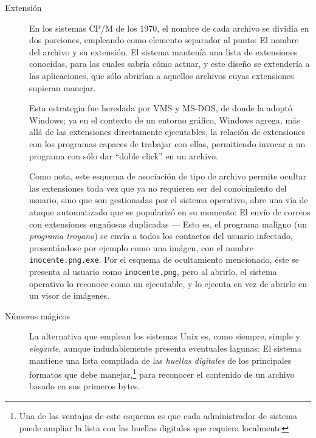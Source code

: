 \documentclass[11pt,fleqn]{book} %
\begin{document}
\begin{description}
\item[Extensión] En los sistemas CP/M de los 1970, el nombre de cada
               archivo se dividía en dos porciones, empleando como
               elemento separador al punto: El nombre del archivo y su
               extensión. El sistema mantenía una lista de extensiones
               conocidas, para las cuales sabría cómo actuar, y este
               diseño se extendería a las aplicaciones, que sólo
               abrirían a aquellos archivos cuyas extensiones
               supieran manejar.

	       Esta estrategia fue heredada por VMS y MS-DOS, de
               donde la adoptó Windows; ya en el contexto de un
               entorno gráfico, Windows agrega, más allá de las
               extensiones directamente ejecutables, la relación de
               extensiones con los programas capaces de trabajar con
               ellas, permitiendo invocar a un programa con sólo dar
               ``doble click'' en un archivo.

	       Como nota, este esquema de asociación de tipo de
               archivo permite ocultar las extensiones toda vez que ya
               no requieren ser del conocimiento del usuario, sino que
               son gestionadas por el sistema operativo, abre una vía
               de ataque automatizado que se popularizó en su momento:
               El envío de correos con extensiones engañosas
               duplicadas — Esto es, el programa maligno (un \emph{programa                troyano}) se envía a todos los contactos del usuario
               infectado, presentándose por ejemplo como una imágen,
               con el nombre \texttt{inocente.png.exe}. Por el esquema de
               ocultamiento mencionado, éste se presenta al usuario
               como \texttt{inocente.png}, pero al abrirlo, el sistema
               operativo lo reconoce como un ejecutable, y lo ejecuta
               en vez de abrirlo en un visor de imágenes.
\item[Números mágicos] La alternativa que emplean los sistemas Unix es,
     como siempre, simple y \emph{elegante}, aunque indudablemente presenta
     eventuales lagunas: El sistema mantiene una lista compilada de
     las \emph{huellas digitales} de los principales formatos que debe
     manejar,\footnote{Una de las ventajas de este esquema es que cada
     administrador de sistema puede ampliar la lista con las huellas
     digitales que requiera localmente } para reconocer el contenido
     de un archivo basado en sus primeros bytes.


\end{description}
\end{document}
